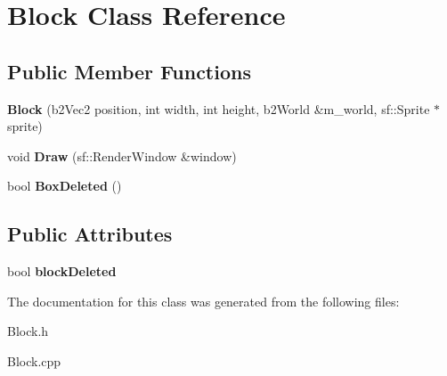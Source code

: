 \hypertarget{class_block}{}\section{Block Class Reference}
\label{class_block}
\subsection*{Public Member Functions}
\begin{DoxyCompactItemize}
\item 
{\bfseries Block} (b2\+Vec2 position, int width, int height, b2\+World \&m\+\_\+world, sf\+::\+Sprite $\ast$sprite)\hypertarget{class_block_a49324dbecf6091e4e650d5e23b1520c2}{}\label{class_block_a49324dbecf6091e4e650d5e23b1520c2}

\item 
void {\bfseries Draw} (sf\+::\+Render\+Window \&window)\hypertarget{class_block_a9ca1e5acd54c62d083aba4977ad0b1fc}{}\label{class_block_a9ca1e5acd54c62d083aba4977ad0b1fc}

\item 
bool {\bfseries Box\+Deleted} ()\hypertarget{class_block_a1e397ca0c7bc5b48747f4e329122a6a0}{}\label{class_block_a1e397ca0c7bc5b48747f4e329122a6a0}

\end{DoxyCompactItemize}
\subsection*{Public Attributes}
\begin{DoxyCompactItemize}
\item 
bool {\bfseries block\+Deleted}\hypertarget{class_block_a379fdda2de977ec2eb6998877d780cec}{}\label{class_block_a379fdda2de977ec2eb6998877d780cec}

\end{DoxyCompactItemize}


The documentation for this class was generated from the following files\+:\begin{DoxyCompactItemize}
\item 
Block.\+h\item 
Block.\+cpp\end{DoxyCompactItemize}
